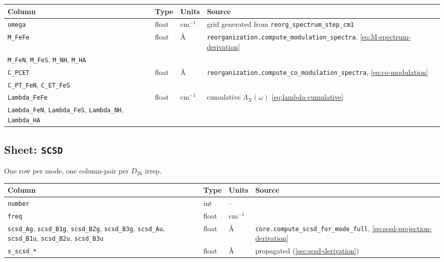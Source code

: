 \documentclass[10pt,a4paper,twoside]{article}
\newcommand{\fn}[1]{\texttt{#1}}
\newcommand{\cfgkey}[1]{\texttt{#1}}
\begin{document}
\begin{longtable}{p{} p{} p{} p{}}
\toprule
\textbf{Column} & \textbf{Type} & \textbf{Units} & \textbf{Source} \\
\midrule
\texttt{omega}     & float & cm$^{-1}$ & grid generated from
                                          \cfgkey{reorg\_spectrum\_step\_cm1} \\
\texttt{M\_FeFe}   & float & \AA{}     & \fn{reorganization.compute\_modulation\_spectra}, \cref{eq:M-spectrum-derivation} \\
\texttt{M\_FeN}, \texttt{M\_FeS}, \texttt{M\_NH}, \texttt{M\_HA} & & & \\
\texttt{C\_PCET}   & float & \AA{}     & \fn{reorganization.compute\_co\_modulation\_spectra}, \cref{eq:co-modulation} \\
\texttt{C\_PT\_FeN}, \texttt{C\_ET\_FeS} & & & \\
\texttt{Lambda\_FeFe} & float & cm$^{-1}$ & cumulative
                            $\Lambda_X(\omega)$ \cref{eq:lambda-cumulative} \\
\texttt{Lambda\_FeN}, \texttt{Lambda\_FeS}, \texttt{Lambda\_NH},
\texttt{Lambda\_HA} & & & \\
\bottomrule
\end{longtable}

\subsection{Sheet: \texttt{SCSD}}

One row per mode, one column-pair per $D_{2\mathrm{h}}$ irrep.

\begin{longtable}{p{} p{} p{} p{}}
\toprule
\textbf{Column} & \textbf{Type} & \textbf{Units} & \textbf{Source} \\
\midrule
\texttt{number}     & int    & --     & \\
\texttt{freq}       & float  & cm$^{-1}$ & \\
\texttt{scsd\_Ag}, \texttt{scsd\_B1g}, \texttt{scsd\_B2g},
\texttt{scsd\_B3g}, \texttt{scsd\_Au}, \texttt{scsd\_B1u},
\texttt{scsd\_B2u}, \texttt{scsd\_B3u}
   & float  & \AA{}     & \fn{core.compute\_scsd\_for\_mode\_full},
                          \cref{eq:scsd-projection-derivation} \\
\texttt{s\_scsd\_*} & float & \AA{} & propagated (\cref{sec:scsd-derivation}) \\
\bottomrule
\end{longtable}
\end{document}
